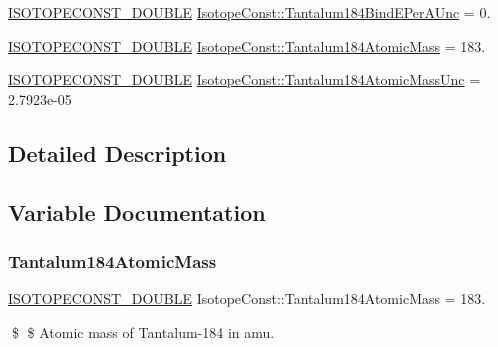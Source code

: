 \begin{DoxyCompactItemize}
\mbox{\hyperlink{group___isotope_const-_macros_ga8f45a7272ce02c0b4c65c44636ed719a}{I\+S\+O\+T\+O\+P\+E\+C\+O\+N\+S\+T\+\_\+\+D\+O\+U\+B\+LE}} \mbox{\hyperlink{group___isotope_const-_tantalum-_ta184_ga35dba757ffbf52bc9baac32b4b2b6ee2}{Isotope\+Const\+::\+Tantalum184\+Bind\+E\+Per\+A\+Unc}} = 0.
\item 
\mbox{\hyperlink{group___isotope_const-_macros_ga8f45a7272ce02c0b4c65c44636ed719a}{I\+S\+O\+T\+O\+P\+E\+C\+O\+N\+S\+T\+\_\+\+D\+O\+U\+B\+LE}} \mbox{\hyperlink{group___isotope_const-_tantalum-_ta184_ga8d43d71e2226a12e9d81be9f94391e5e}{Isotope\+Const\+::\+Tantalum184\+Atomic\+Mass}} = 183.
\item 
\mbox{\hyperlink{group___isotope_const-_macros_ga8f45a7272ce02c0b4c65c44636ed719a}{I\+S\+O\+T\+O\+P\+E\+C\+O\+N\+S\+T\+\_\+\+D\+O\+U\+B\+LE}} \mbox{\hyperlink{group___isotope_const-_tantalum-_ta184_gafb5376ab76a235e0301a8b84a4a805b8}{Isotope\+Const\+::\+Tantalum184\+Atomic\+Mass\+Unc}} = 2.\+7923e-\/05
\end{DoxyCompactItemize}


\subsection{Detailed Description}


\subsection{Variable Documentation}
\mbox{\label{group___isotope_const-_tantalum-_ta184_ga8d43d71e2226a12e9d81be9f94391e5e}} 
\subsubsection{\texorpdfstring{Tantalum184\+Atomic\+Mass}{Tantalum184AtomicMass}}
{\footnotesize\ttfamily \mbox{\hyperlink{group___isotope_const-_macros_ga8f45a7272ce02c0b4c65c44636ed719a}{I\+S\+O\+T\+O\+P\+E\+C\+O\+N\+S\+T\+\_\+\+D\+O\+U\+B\+LE}} Isotope\+Const\+::\+Tantalum184\+Atomic\+Mass = 183.}

\$ \$ Atomic mass of Tantalum-\/184 in amu. \mbox{\label{group___isotope_const-_tantalum-_ta184_gafb5376ab76a235e0301a8b84a4a805b8}} 
